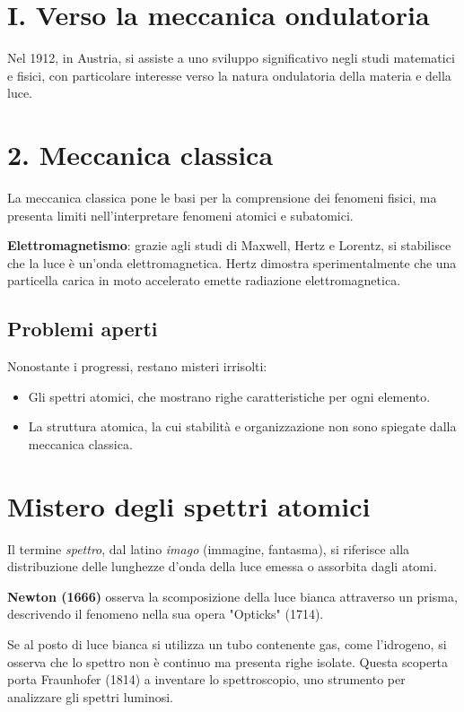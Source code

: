 
\section*{I. Verso la meccanica ondulatoria}
Nel 1912, in Austria, si assiste a uno sviluppo significativo negli studi matematici e fisici, con particolare interesse verso la natura ondulatoria della materia e della luce.

\section*{2. Meccanica classica}
La meccanica classica pone le basi per la comprensione dei fenomeni fisici, ma presenta limiti nell'interpretare fenomeni atomici e subatomici. 

\textbf{Elettromagnetismo}: grazie agli studi di Maxwell, Hertz e Lorentz, si stabilisce che la luce è un'onda elettromagnetica. Hertz dimostra sperimentalmente che una particella carica in moto accelerato emette radiazione elettromagnetica.

\subsection*{Problemi aperti}
Nonostante i progressi, restano misteri irrisolti:
\begin{itemize}
    \item Gli spettri atomici, che mostrano righe caratteristiche per ogni elemento.
    \item La struttura atomica, la cui stabilità e organizzazione non sono spiegate dalla meccanica classica.
\end{itemize}

\section*{Mistero degli spettri atomici}
Il termine \emph{spettro}, dal latino \emph{imago} (immagine, fantasma), si riferisce alla distribuzione delle lunghezze d'onda della luce emessa o assorbita dagli atomi.

\textbf{Newton (1666)} osserva la scomposizione della luce bianca attraverso un prisma, descrivendo il fenomeno nella sua opera "Opticks" (1714).

Se al posto di luce bianca si utilizza un tubo contenente gas, come l'idrogeno, si osserva che lo spettro non è continuo ma presenta righe isolate. Questa scoperta porta Fraunhofer (1814) a inventare lo spettroscopio, uno strumento per analizzare gli spettri luminosi.

